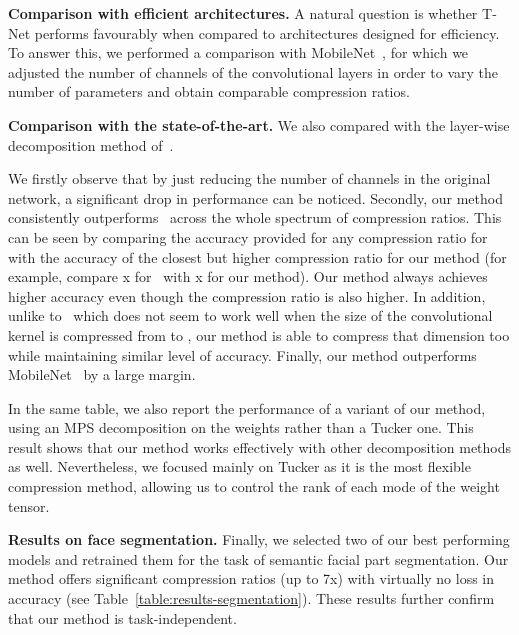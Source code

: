 \documentclass[10pt,twocolumn,letterpaper]{article}
\begin{document}
\textbf{Comparison with efficient architectures.} A natural question is whether T-Net performs favourably when compared to architectures designed for efficiency. To answer this, we performed a comparison with MobileNet~\cite{mobilenets}, for which we adjusted the number of channels of the convolutional layers in order to vary the number of parameters and obtain comparable compression ratios.

\textbf{Comparison with the state-of-the-art.} We also compared 
with the layer-wise decomposition method of~\cite{yong2015compression}. 

We firstly observe that by just reducing the number of channels in the original network, a significant drop in performance can be noticed. Secondly, our method consistently outperforms~\cite{yong2015compression} across the whole spectrum of compression ratios. This can be seen by comparing the accuracy provided for any compression ratio for~\cite{yong2015compression} with the accuracy of the closest but higher compression ratio for our method (for example, compare x for~\cite{yong2015compression} with x for our method). Our method always achieves higher accuracy even though the compression ratio is also higher. In addition, unlike to~\cite{yong2015compression} which does not seem to work well when the size of the convolutional kernel is compressed from  to , our method is able to compress that dimension too while maintaining similar level of accuracy. Finally, our method outperforms MobileNet~\cite{mobilenets} by a large margin. 


In the same table, we also report the performance of a variant of our method, using an MPS decomposition on the weights rather than a Tucker one. This result shows that our method works effectively with other decomposition methods as well. Nevertheless, we focused mainly on Tucker as it is the most flexible compression method, allowing us to control the rank of each mode of the weight tensor.

\textbf{Results on face segmentation.}
Finally, we selected two of our best performing models and retrained them for the task of semantic facial part segmentation. Our method offers significant compression ratios (up to 7x) with virtually no loss in accuracy (see Table~\ref{table:results-segmentation}). These results further confirm that our method is task-independent.
\end{document}
